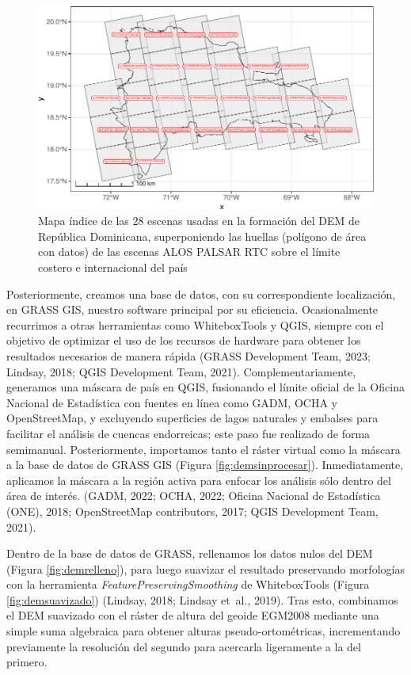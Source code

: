 \documentclass[spanish]{article}
\begin{document}
\begin{figure}

{\centering \includegraphics[width=1\linewidth]{preprint_files/figure-latex/mapaindice-1} 

}

\caption{Mapa índice de las 28 escenas usadas en la formación del DEM de República Dominicana, superponiendo las huellas (polígono de área con datos) de las escenas ALOS PALSAR RTC sobre el límite costero e internacional del país}\label{fig:mapaindice}
\end{figure}

Posteriormente, creamos una base de datos, con su correspondiente
localización, en GRASS GIS, nuestro software principal por su
eficiencia. Ocasionalmente recurrimos a otras herramientas como
WhiteboxTools y QGIS, siempre con el objetivo de optimizar el uso de los
recursos de hardware para obtener los resultados necesarios de manera
rápida (GRASS Development Team, 2023; Lindsay, 2018; QGIS Development
Team, 2021). Complementariamente, generamos una máscara de país en QGIS,
fusionando el límite oficial de la Oficina Nacional de Estadística con
fuentes en línea como GADM, OCHA y OpenStreetMap, y excluyendo
superficies de lagos naturales y embalses para facilitar el análisis de
cuencas endorreicas; este paso fue realizado de forma semimanual.
Posteriormente, importamos tanto el ráster virtual como la máscara a la
base de datos de GRASS GIS (Figura \ref{fig:demsinprocesar}).
Inmediatamente, aplicamos la máscara a la región activa para enfocar los
análisis sólo dentro del área de interés. (GADM, 2022; OCHA, 2022;
Oficina Nacional de Estadística (ONE), 2018; OpenStreetMap contributors,
2017; QGIS Development Team, 2021).

Dentro de la base de datos de GRASS, rellenamos los datos nulos del DEM
(Figura \ref{fig:demrelleno}), para luego suavizar el resultado
preservando morfologías con la herramienta
\emph{FeaturePreservingSmoothing} de WhiteboxTools (Figura
\ref{fig:demsuavizado}) (Lindsay, 2018; Lindsay et~al., 2019). Tras
esto, combinamos el DEM suavizado con el ráster de altura del geoide
EGM2008 mediante una simple suma algebraica para obtener alturas
pseudo-ortométricas, incrementando previamente la resolución del segundo
para acercarla ligeramente a la del primero.
\end{document}
